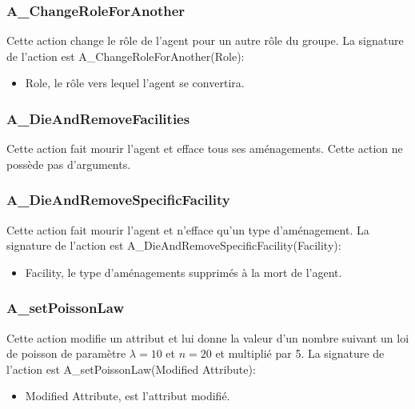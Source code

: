 \subsubsection{A\_ChangeRoleForAnother}

Cette action change le rôle de l'agent pour un autre rôle du groupe.
La signature de l'action est A\_ChangeRoleForAnother(Role):
\begin{itemize}
\item Role, le rôle vers lequel l'agent se convertira.
\end{itemize}

\subsubsection{A\_DieAndRemoveFacilities}

Cette action fait mourir l'agent et efface tous ses aménagements.
Cette action ne possède pas d'arguments.

\subsubsection{A\_DieAndRemoveSpecificFacility}

Cette action fait mourir l'agent et n'efface qu'un type d'aménagement.
La signature de l'action est A\_DieAndRemoveSpecificFacility(Facility):
\begin{itemize}
\item Facility, le type d'aménagements supprimés à la mort de l'agent.
\end{itemize}


\subsubsection{A\_setPoissonLaw}

Cette action modifie un attribut et lui donne la valeur d'un nombre suivant un loi de poisson de paramètre $\lambda = 10$ et $n=20$ et multiplié par 5.
La signature de l'action est A\_setPoissonLaw(Modified Attribute):
\begin{itemize}
\item Modified Attribute, est l'attribut modifié.
\end{itemize}
